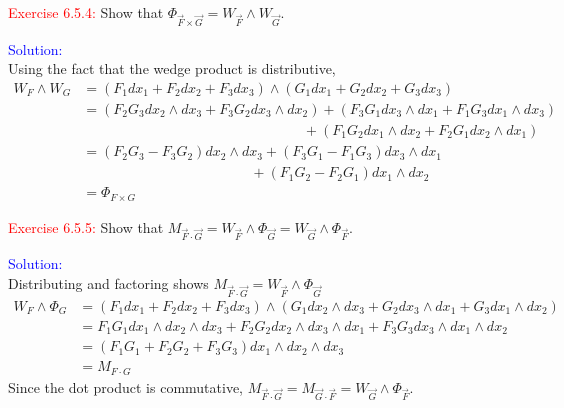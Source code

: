 \documentclass[12pt]{article}
\begin{document}
\newpage







\textcolor{red}{Exercise 6.5.4:}
Show that $\Phi_{\vec F\times \vec G} = W_{\vec F}\wedge W_{\vec G}$.


\bigskip

\textcolor{blue}{Solution:} \\
    Using the fact that the wedge product is distributive,
    \begin{align*}
        W_F\wedge W_G
        &= (F_1 dx_1 + F_2 dx_2 + F_3 dx_3) \wedge (G_1 dx_1 + G_2 dx_2 + G_3 dx_3) \\
        &= (F_2G_3 dx_2 \wedge  dx_3 + F_3G_2 dx_3 \wedge  dx_2) 
            + (F_3G_1 dx_3 \wedge dx_1 +  F_1G_3 dx_1 \wedge dx_3) \\
            &\hspace{189pt}+ (F_1G_2 dx_1 \wedge dx_2 +  F_2G_1 dx_2 \wedge dx_1) \\
        &= (F_2G_3 - F_3G_2) dx_2 \wedge dx_3
            + (F_3G_1 - F_1G_3) dx_3 \wedge dx_1 \\
            &\hspace{12em}+ (F_1G_2 - F_2G_1) dx_1 \wedge dx_2 \\
        &= \Phi_{F\times G} 
    \end{align*}
\newpage







\textcolor{red}{Exercise 6.5.5:}
Show that $M_{\vec F\cdot\vec G} = W_{\vec F}\wedge \Phi_{\vec G} = W_{\vec G}\wedge\Phi_{\vec F}$.


\bigskip

\textcolor{blue}{Solution:} \\
    Distributing and factoring shows $M_{\vec F\cdot\vec G} = W_{\vec F}\wedge \Phi_{\vec G}$
    \begin{align*}
        W_F \wedge \Phi_G
        &= (F_1 dx_1 + F_2 dx_2 + F_3 dx_3) \wedge 
            (G_1 dx_2 \wedge dx_3 + G_2 dx_3 \wedge dx_1 + G_3 dx_1 \wedge dx_2) \\
        &= F_1G_1 dx_1 \wedge dx_2 \wedge dx_3 
           + F_2G_2 dx_2 \wedge dx_3 \wedge dx_1 
           + F_3G_3 dx_3 \wedge dx_1 \wedge dx_2 \\
        &= (F_1G_1 + F_2G_2 + F_3G_3) dx_1 \wedge dx_2 \wedge dx_3  \\
        &= M_{F\cdot G}
    \end{align*}
    Since the dot product is commutative, 
    $M_{\vec F\cdot\vec G} = M_{\vec G\cdot\vec F} = W_{\vec G}\wedge \Phi_{\vec F}$.
\newpage
\end{document}
